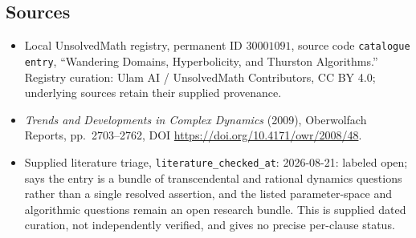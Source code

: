 \documentclass[11pt]{article}
\begin{document}
\subsection{Sources}
\begin{itemize}
\item Local UnsolvedMath registry, permanent ID \(30001091\), source code \texttt{catalogue entry}, ``Wandering Domains, Hyperbolicity, and Thurston Algorithms.'' Registry curation: Ulam AI / UnsolvedMath Contributors, CC BY 4.0; underlying sources retain their supplied provenance.
\item \emph{Trends and Developments in Complex Dynamics} (2009), Oberwolfach Reports, pp.\ 2703--2762, DOI \url{https://doi.org/10.4171/owr/2008/48}.
\item Supplied literature triage, \texttt{literature\_checked\_at}: 2026-08-21: labeled open; says the entry is a bundle of transcendental and rational dynamics questions rather than a single resolved assertion, and the listed parameter-space and algorithmic questions remain an open research bundle. This is supplied dated curation, not independently verified, and gives no precise per-clause status.
\end{itemize}
\end{document}
